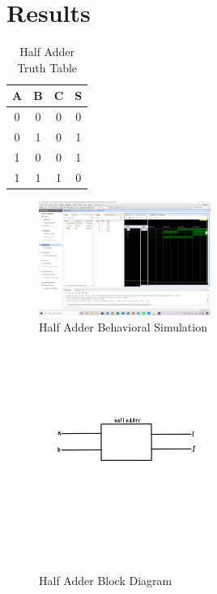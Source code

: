 \documentclass[11pt]{article}
\begin{document}
\section*{Results}

\begin{table}[h]\centering
	\caption{Half Adder Truth Table }
	\label{tbl:example_table}
	\begin{tabular}{cc|cc}
		\toprule
		A & B & C & S \\
		\midrule
		0 & 0 & 0 & 0 \\
		0 & 1 & 0 & 1 \\
		1 & 0 & 0 & 1 \\
		1 & 1 & 1 & 0 \\
		\bottomrule
	\end{tabular} 
\end{table}

\begin{figure}[h]\centering
	\includegraphics[width=0.5\textwidth,trim=43cm 30cm 0cm 8cm,clip]{halfadder sim}
	\caption{Half Adder Behavioral Simulation}
\end{figure}

\begin{figure}[h]\centering
	\includegraphics[width=0.5\textwidth,trim=0cm 25cm 0cm 15cm,clip]{halfadder block diagram}
	\caption{Half Adder Block Diagram}
\end{figure}
\end{document}
